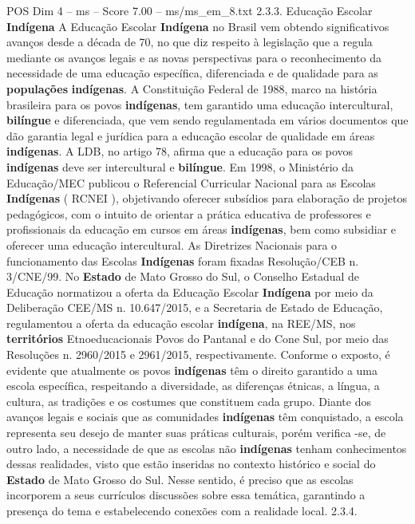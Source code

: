 \begin{textsample}{POS Dim 4 – ms – Score 7.00 – ms/ms\_em\_8.txt}  \label{ex:f4_pos_156}
2.3.3.
Educação Escolar \textbf{Indígena} A Educação Escolar \textbf{Indígena} no Brasil vem obtendo significativos avanços desde a década de 70, no que diz respeito à legislação que a regula mediante os avanços legais e as novas perspectivas para o reconhecimento da necessidade de uma educação específica, diferenciada e de qualidade para as \textbf{populações} \textbf{indígenas}.
A Constituição Federal de 1988, marco na história brasileira para os povos \textbf{indígenas}, tem garantido uma educação intercultural, \textbf{bilíngue} e diferenciada, que vem sendo regulamentada em vários documentos que dão garantia legal e jurídica para a educação escolar de qualidade em áreas \textbf{indígenas}.
A LDB, no artigo 78, afirma que a educação para os povos \textbf{indígenas} deve ser intercultural e \textbf{bilíngue}.
Em 1998, o Ministério da Educação/MEC publicou o Referencial Curricular Nacional para as Escolas \textbf{Indígenas} ( RCNEI ), objetivando oferecer subsídios para elaboração de projetos pedagógicos, com o intuito de orientar a prática educativa de professores e profissionais da educação em cursos em áreas \textbf{indígenas}, bem como subsidiar e oferecer uma educação intercultural.
As Diretrizes Nacionais para o funcionamento das Escolas \textbf{Indígenas} foram fixadas Resolução/CEB n. 3/CNE/99.
No \textbf{Estado} de Mato Grosso do Sul, o Conselho Estadual de Educação normatizou a oferta da Educação Escolar \textbf{Indígena} por meio da Deliberação CEE/MS n. 10.647/2015, e a Secretaria de Estado de Educação, regulamentou a oferta da educação escolar \textbf{indígena}, na REE/MS, nos \textbf{territórios} Etnoeducacionais Povos do Pantanal e do Cone Sul, por meio das Resoluções n. 2960/2015 e 2961/2015, respectivamente.
Conforme o exposto, é evidente que atualmente os povos \textbf{indígenas} têm o direito garantido a uma escola específica, respeitando a diversidade, as diferenças étnicas, a língua, a cultura, as tradições e os costumes que constituem cada grupo.
Diante dos avanços legais e sociais que as comunidades \textbf{indígenas} têm conquistado, a escola representa seu desejo de manter suas práticas culturais, porém verifica -se, de outro lado, a necessidade de que as escolas não \textbf{indígenas} tenham conhecimentos dessas realidades, visto que estão inseridas no contexto histórico e social do \textbf{Estado} de Mato Grosso do Sul.
Nesse sentido, é preciso que as escolas incorporem a seus currículos discussões sobre essa temática, garantindo a presença do tema e estabelecendo conexões com a realidade local. 2.3.4.

\end{textsample}
